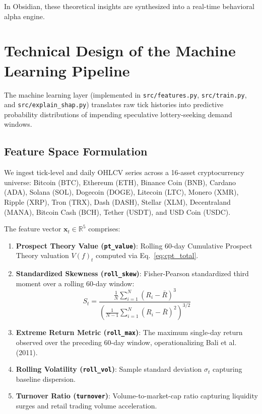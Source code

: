 \documentclass[10pt,journal,compsoc]{IEEEtran}
\begin{document}
In Obsidian, these theoretical insights are synthesized into a real-time behavioral alpha engine.

\section{Technical Design of the Machine Learning Pipeline}

The machine learning layer (implemented in \texttt{src/features.py}, \texttt{src/train.py}, and \texttt{src/explain\_shap.py}) translates raw tick histories into predictive probability distributions of impending speculative lottery-seeking demand windows.

\subsection{Feature Space Formulation}
We ingest tick-level and daily OHLCV series across a 16-asset cryptocurrency universe: Bitcoin (BTC), Ethereum (ETH), Binance Coin (BNB), Cardano (ADA), Solana (SOL), Dogecoin (DOGE), Litecoin (LTC), Monero (XMR), Ripple (XRP), Tron (TRX), Dash (DASH), Stellar (XLM), Decentraland (MANA), Bitcoin Cash (BCH), Tether (USDT), and USD Coin (USDC).

The feature vector $\mathbf{x}_t \in \mathbb{R}^5$ comprises:
\begin{enumerate}
    \item \textbf{Prospect Theory Value (\texttt{pt\_value})}: Rolling 60-day Cumulative Prospect Theory valuation $V(f)_t$ computed via Eq.~\eqref{eq:cpt_total}.
    \item \textbf{Standardized Skewness (\texttt{roll\_skew})}: Fisher-Pearson standardized third moment over a rolling 60-day window:
    \begin{equation}
    S_t = \frac{\frac{1}{N}\sum_{i=1}^N (R_i - \bar{R})^3}{\left(\frac{1}{N-1}\sum_{i=1}^N (R_i - \bar{R})^2\right)^{3/2}}
    \end{equation}
    \item \textbf{Extreme Return Metric (\texttt{roll\_max})}: The maximum single-day return observed over the preceding 60-day window, operationalizing Bali et al. (2011).
    \item \textbf{Rolling Volatility (\texttt{roll\_vol})}: Sample standard deviation $\sigma_t$ capturing baseline dispersion.
    \item \textbf{Turnover Ratio (\texttt{turnover})}: Volume-to-market-cap ratio capturing liquidity surges and retail trading volume acceleration.
\end{enumerate}
\end{document}
